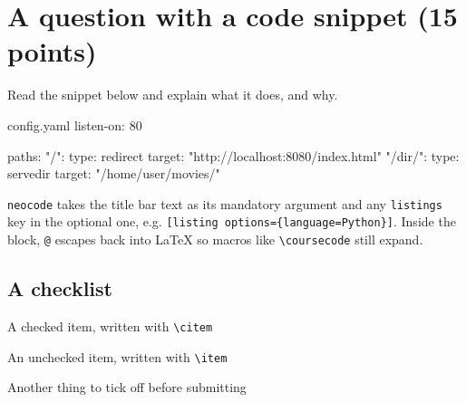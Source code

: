 \section{A question with a code snippet (15 points)}

Read the snippet below and explain what it does, and why.

\begin{neocode}[neocodetitlefont=\small\pixelfont]{config.yaml}
listen-on: 80

paths:
  "/":
    type: redirect
    target: "http://localhost:8080/index.html"
  "/dir/":
    type: servedir
    target: "/home/user/movies/"
\end{neocode}

\texttt{neocode} takes the title bar text as its mandatory argument and any
\texttt{listings} key in the optional one, e.g.
\texttt{[listing options=\{language=Python\}]}. Inside the block,
\texttt{@\ldots@} escapes back into \LaTeX{} so macros like
\texttt{\textbackslash coursecode} still expand.

\subsection{A checklist}

\begin{neochecklist}
    \citem A checked item, written with \texttt{\textbackslash citem}
    \item An unchecked item, written with \texttt{\textbackslash item}
    \item Another thing to tick off before submitting
\end{neochecklist}
